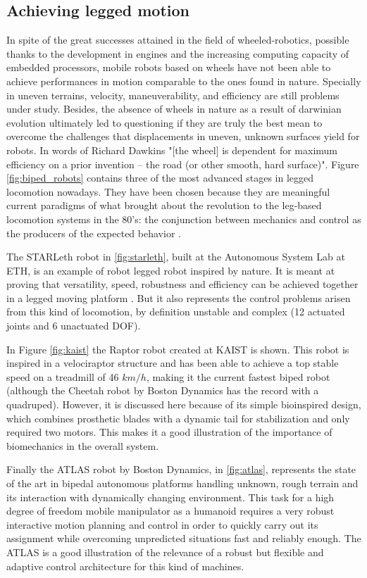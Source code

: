 \subsection{Achieving legged motion} %
\label{sub:legged_motion_in_robotics}
In spite of the great successes attained in the field of wheeled-robotics, possible thanks to the development in engines and the increasing computing capacity of embedded processors, mobile robots based on wheels have not been able to achieve performances in motion comparable to the ones found in nature.
Specially in uneven terrains, velocity, maneuverability, and efficiency are still problems under study.
Besides, the absence of wheels in nature as a result of darwinian evolution ultimately led to questioning \cite{dawkins} if they are truly the best mean to overcome the challenges that displacements in uneven, unknown surfaces yield for robots.
In words of Richard Dawkins \cite{dawkins} "[the wheel] is dependent for maximum efficiency on a prior invention – the road (or other smooth, hard surface)". 
Figure \ref{fig:biped_robots} contains three of the most advanced stages in legged locomotion nowadays.
They have been chosen because they are meaningful current paradigms of what brought about the revolution to the leg-based locomotion systems in the 80's: the conjunction between mechanics and control as the producers of the expected behavior \cite{mit_leg_lab1}.

The STARLeth robot in \ref{fig:starleth}, built at the Autonomous System Lab at ETH, is an example of robot legged robot inspired by nature. 
It is meant at proving that versatility, speed, robustness and efficiency can be achieved together in a legged moving platform \cite{starleth}.
But it also represents the control problems arisen from this kind of locomotion, by definition unstable and complex (12 actuated joints and 6 unactuated DOF). 

In Figure \ref{fig:kaist} the Raptor robot created at KAIST is shown.
This robot is inspired in a velociraptor structure and has been able to achieve a top stable speed on a treadmill of 46 $km/h$, making it the current fastest biped robot (although the Cheetah robot by Boston Dynamics has the record with a quadruped).
However, it is discussed here because of its simple bioinspired design, which combines prosthetic blades with a dynamic tail for stabilization and only required two motors.
This makes it a good illustration of the importance of biomechanics in the overall system.

Finally the ATLAS robot by Boston Dynamics, in \ref{fig:atlas}, represents the state of the art in bipedal autonomous platforms handling unknown, rough terrain and its interaction with dynamically changing environment.
This task for a high degree of freedom mobile manipulator as a humanoid requires a very robust interactive motion planning and control in order to quickly carry out its assignment while overcoming unpredicted situations fast and reliably enough.
The ATLAS is a good illustration of the relevance of a robust but flexible and adaptive control architecture for this kind of machines.


